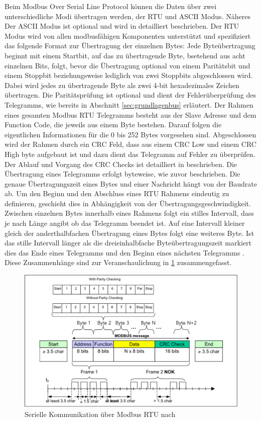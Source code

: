 Beim Modbus Over Serial Line Protocol können die Daten über zwei unterschiedliche Modi übertragen werden, der RTU und ASCII Modus. Näheres Der ASCII Modus ist optional und wird in \cite{mod06ser} detailliert beschrieben. Der RTU Modus wird von allen modbusfähigen Komponenten unterstützt und spezifiziert das folgende Format zur Übertragung der einzelnen Bytes: Jede Byteübertragung beginnt mit einem Startbit, auf das zu übertragende Byte, bsetehend aus acht einzelnen Bits, folgt, bevor die Übertragung optional von einem Paritätsbit und einem Stoppbit beziehungsweise lediglich von zwei Stoppbits abgeschlossen wird. Dabei wird jedes zu übertragende Byte als zwei 4-bit hexadezimales Zeichen übertragen\cite[S.~12f.]{mod06ser}. Die Paritätsprüfung ist optional und dient der Fehlerüberprüfung des Telegramms, wie bereits in Abschnitt \ref{sec:grundlagenbus} erläutert.
Der Rahmen eines gesamten Modbus RTU Telegramms besteht aus der Slave Adresse und dem Function Code, die jeweils aus einem Byte bestehen. Darauf folgen die eigentlichen Informationen für die 0 bis 252 Bytes vorgesehen sind. Abgeschlossen wird der Rahmen durch ein CRC Feld, dass aus einem CRC Low und einem CRC High byte aufgebaut ist und dazu dient das Telegramm auf Fehler zu überprüfen. Der Ablauf und Vorgang des CRC Checks ist detailliert in \cite{mod06ser} beschrieben. Die Übertragung eines Telegramms erfolgt byteweise, wie zuvor beschrieben.
Die genaue Übertragungszeit eines Bytes und einer Nachricht hängt von der Baudrate ab. Um den Beginn und den Abschluss eines RTU Rahmens eindeutig zu definieren, geschieht dies in Abhängigkeit von der Übertragungsgeschwindigkeit. Zwischen einzelnen Bytes innerhalb eines Rahmens folgt ein stilles Intervall, dass je nach Länge angibt ob das Telegramm beendet ist. Auf eine Intervall kleiner gleich der anderthalbfachen Übertragung eines Bytes folgt eine weiteres Byte. Ist das stille Intervall länger als die dreieinhalbfache Byteübertragungszeit markiert dies das Ende eines Telegramms und den Beginn eines nächsten Telegramms \cite[S.~13]{mod06ser}. Diese Zusammenhänge sind zur Veranschaulichung in \ref{fig:modbusrtu} zusammengefasst.

\begin{figure}
\centering
\includegraphics[width=\textwidth]{abbildungen/20160321_rtu}
\caption[Serielle Kommunikation über Modbus RTU]{Serielle Kommunikation über Modbus RTU nach \cite[S.~12f.]{mod06ser}}
\label{fig:modbusrtu}
\end{figure}

